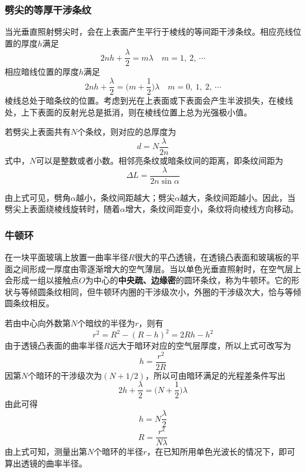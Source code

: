 \documentclass[cn,10pt,chinesefont=founder,math=mtpro2,cite=super,toc=onecol,twoside]{elegantbook}
\begin{document}
\subsubsection{劈尖的等厚干涉条纹}
当光垂直照射劈尖时，会在上表面产生平行于棱线的等间距干涉条纹。相应亮线位置的厚度$h$满足
\begin{equation}
2nh+\frac{\lambda}{2}=m\lambda\quad m=1,\ 2,\ \cdots
\end{equation}
相应暗线位置的厚度$h$满足
\begin{equation}
2nh+\frac{\lambda}{2}=\bigg(m+\frac{1}{2}\bigg)\lambda\quad m=0,\ 1,\ 2,\ \cdots
\end{equation}
棱线总处于暗条纹的位置。考虑到光在上表面或下表面会产生半波损失，在棱线处，上下表面的反射光总是抵消，则在棱线位置上总为光强极小值。

若劈尖上表面共有$N$个条纹，则对应的总厚度为
\begin{equation}
d=N\frac{\lambda}{2n}
\end{equation}
式中，$N$可以是整数或者小数。相邻亮条纹或暗条纹间的距离，即条纹间距为
\begin{equation}
\Delta L=\frac{\lambda}{2n\sin\alpha}
\end{equation}
\begin{conclusion}
由上式可见，劈角$\alpha$越小，条纹间距越大；劈尖$\alpha$越大，条纹间距越小。因此，当劈尖上表面绕棱线旋转时，随着$\alpha$增大，条纹间距变小，条纹将向棱线方向移动。
\end{conclusion}

\subsubsection{牛顿环}

在一块平面玻璃上放置一曲率半径$R$很大的平凸透镜，在透镜凸表面和玻璃板的平面之间形成一厚度由零逐渐增大的空气薄层。当以单色光垂直照射时，在空气层上会形成一组以接触点$O$为中心的\textbf{中央疏、边缘密}的圆环条纹，称为牛顿环。它的形状与等倾圆条纹相同，但牛顿环内圈的干涉级次小，外圈的干涉级次大，恰与等倾圆条纹相反。

若由中心向外数第$N$个暗纹的半径为$r$，则有
\begin{equation}
r^2=R^2-(R-h)^2=2Rh-h^2
\end{equation}
由于透镜凸表面的曲率半径$R$远大于暗环对应的空气层厚度，所以上式可改写为
\begin{equation}
h=\frac{r^2}{2R}
\end{equation}
因第$N$个暗环的干涉级次为$(N+1/2)$，所以可由暗环满足的光程差条件写出
\begin{equation}
2h+\frac{\lambda}{2}=\bigg(N+\frac{1}{2}\bigg)\lambda
\end{equation}
由此可得
\begin{equation}
h=N\frac{\lambda}{2}
\end{equation}
\begin{equation}
R=\frac{r^2}{N\lambda}
\end{equation}
由上式可知，测量出第$N$个暗环的半径$r$，在已知所用单色光波长的情况下，即可算出透镜的曲率半径。
\end{document}
